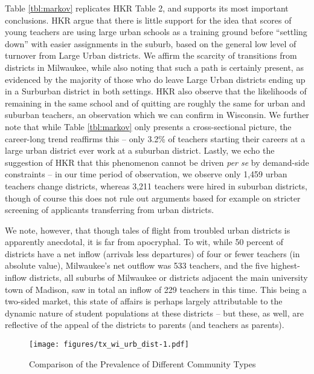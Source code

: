 Table \ref{tbl:markov} replicates HKR Table 2, and supports its most
important conclusions. HKR argue that there is little support for the
idea that scores of young teachers are using large urban schools as a
training ground before ``settling down'' with easier assignments in the
suburb, based on the general low level of turnover from Large Urban
districts. We affirm the scarcity of transitions from districts in
Milwaukee, while also noting that such a path is certainly present, as
evidenced by the majority of those who do leave Large Urban districts
ending up in a Surburban district in both settings. HKR also observe
that the likelihoods of remaining in the same school and of quitting are
roughly the same for urban and suburban teachers, an observation which
we can confirm in Wisconsin. We further note that while Table
\ref{tbl:markov} only presents a cross-sectional picture, the
career-long trend reaffirms this -- only 3.2\% of teachers starting
their careers at a large urban district ever work at a suburban
district. Lastly, we echo the suggestion of HKR that this phenomenon
cannot be driven \emph{per se} by demand-side constraints -- in our time
period of observation, we observe only 1,459 urban teachers change
districts, whereas 3,211 teachers were hired in suburban districts,
though of course this does not rule out arguments based for example on
stricter screening of applicants transferring from urban districts.

We note, however, that though tales of flight from troubled urban
districts is apparently anecdotal, it is far from apocryphal. To wit,
while 50 percent of districts have a net inflow (arrivals less
departures) of four or fewer teachers (in absolute value), Milwaukee's
net outflow was 533 teachers, and the five highest-inflow districts, all
suburbs of Milwaukee or districts adjacent the main university town of
Madison, saw in total an inflow of 229 teachers in this time. This being
a two-sided market, this state of affairs is perhaps largely
attributable to the dynamic nature of student populations at these
districts -- but these, as well, are reflective of the appeal of the
districts to parents (and teachers as parents).

\begin{figure}[htbp]
\centering
\texttt{[image: figures/tx\_wi\_urb\_dist-1.pdf]}
\caption{\label{fig:ti_wi_urb}Comparison of the Prevalence of Different
Community Types}
\end{figure}

